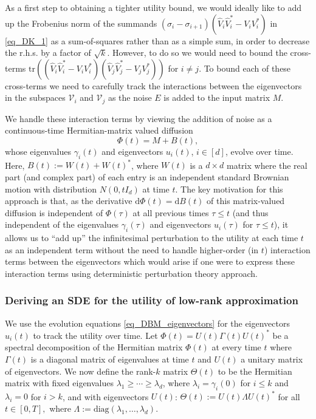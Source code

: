 \documentclass[11pt,letterpaper]{article}
\begin{document}
As a first step to obtaining a tighter utility bound, we would ideally like to add up the Frobenius norm of the summands $(\sigma_i - \sigma_{i+1}) (\hat{V}_i \hat{V}_i^\ast - V_i V_i^\ast)$ in \eqref{eq_DK_1} as a sum-of-squares rather than as a simple sum, in order to decrease the r.h.s. by a factor of $\sqrt{k}$.
%
However, to do so we would need to bound the cross-terms $\mathrm{tr} \left((\hat{V}_i \hat{V}_i^\ast - V_i V_i^\ast)   (\hat{V}_j \hat{V}_j^\ast - V_j V_j^\ast)\right)$ for $i \neq j$.
%  
To bound each of these cross-terms we need to carefully track the interactions between the eigenvectors in the subspaces $\mathcal{V}_i$ and $\mathcal{V}_j$ as the noise $E$ is added to the input matrix $M$.

We handle these interaction terms by viewing the addition of noise as a continuous-time Hermitian-matrix valued diffusion 
%
\begin{equation}\label{eq_n120}
\Phi(t) = M + B(t),
\end{equation}
%
whose eigenvalues $\gamma_i(t)$ and eigenvectors $u_i(t)$, $i\in [d]$, evolve over time.
%
Here, $B(t) := W(t) + W(t)^\ast$, where $W(t)$ is a $d \times d$ matrix where the real part (and complex part) of each entry is an independent standard Brownian motion with distribution $N(0, tI_d)$ at time $t$.
%
The key motivation for this approach is that, as the derivative $\mathrm{d}\Phi(t) = \mathrm{d}B(t)$ of this matrix-valued diffusion is independent of $\Phi(\tau)$ at all previous times $\tau \leq t$ (and thus independent of the eigenvalues  $\gamma_i(\tau)$ and eigenvectors $u_i(\tau)$ for $\tau \leq t$), it allows us to ``add up'' the infinitesimal perturbation to the utility at each time $t$ as an independent term without the need to handle higher-order (in $t$) interaction terms between the eigenvectors which would arise if one were to express these interaction terms using deterministic perturbation theory approach.





\subsubsection{Deriving an SDE for the utility of low-rank approximation} \label{sec_SDE_utility_overview}

We use the evolution equations \eqref{eq_DBM_eigenvectors} for the eigenvectors $u_i(t)$ to track the utility over time.
%
Let $\Phi(t) = U(t) \Gamma(t) U(t)^\ast$  be a spectral decomposition of the Hermitian matrix $\Phi(t)$ at every time $t$ where $\Gamma(t)$ is a diagonal matrix of eigenvalues at time $t$ and $U(t)$ a unitary matrix of eigenvectors.
%
We now define the rank-$k$ matrix $\Theta(t)$ to be the Hermitian matrix with fixed eigenvalues $\lambda_1 \geq \cdots  \geq\lambda_d$, where $\lambda_i = \gamma_i(0)$ for $i\leq k$ and  $\lambda_i =0$ for $i>k$,   and with eigenvectors $U(t)$:  
%
 $  \Theta(t):= U(t) \Lambda U(t)^\ast$ for all $t \in [0,T],$
 where $\Lambda :=\mathrm{diag}(\lambda_1, \ldots, \lambda_d)$.
% 
\end{document}
